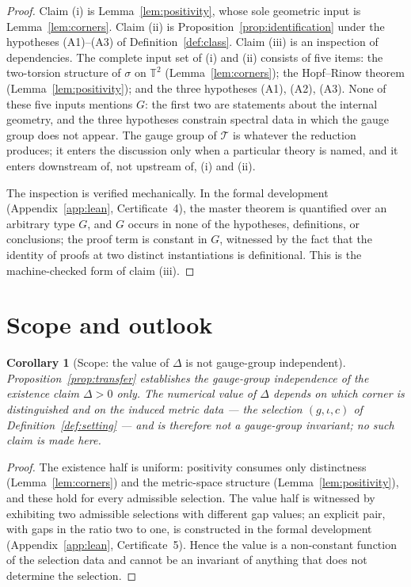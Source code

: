 \documentclass[11pt,a4paper]{article}
\newcommand{\T}{\mathbb{T}}
\newcommand{\thy}{\mathcal{T}}
\theoremstyle{plain}
\newtheorem{corollary}[theorem]{Corollary}
\theoremstyle{definition}
\theoremstyle{remark}
\begin{document}
\begin{proof}
Claim (i) is Lemma~\ref{lem:positivity}, whose sole geometric input is Lemma~\ref{lem:corners}. Claim (ii) is Proposition~\ref{prop:identification} under the hypotheses (A1)--(A3) of Definition~\ref{def:class}. Claim (iii) is an inspection of dependencies. The complete input set of (i) and (ii) consists of five items: the two-torsion structure of $\sigma$ on $\T^2$ (Lemma~\ref{lem:corners}); the Hopf--Rinow theorem (Lemma~\ref{lem:positivity}); and the three hypotheses (A1), (A2), (A3). None of these five inputs mentions $G$: the first two are statements about the internal geometry, and the three hypotheses constrain spectral data in which the gauge group does not appear. The gauge group of $\thy$ is whatever the reduction produces; it enters the discussion only when a particular theory is named, and it enters downstream of, not upstream of, (i) and (ii).

The inspection is verified mechanically. In the formal development (Appendix~\ref{app:lean}, Certificate~4), the master theorem is quantified over an arbitrary type $G$, and $G$ occurs in none of the hypotheses, definitions, or conclusions; the proof term is constant in $G$, witnessed by the fact that the identity of proofs at two distinct instantiations is definitional. This is the machine-checked form of claim (iii).
\end{proof}

\section{Scope and outlook}\label{sec:scope}

\begin{corollary}[Scope: the value of $\Delta$ is not gauge-group
independent]\label{cor:scope} Proposition~\ref{prop:transfer} establishes the gauge-group independence of the existence claim $\Delta > 0$ only. The numerical value of $\Delta$ depends on which corner is distinguished and on the induced metric data --- the selection $(g, \iota, c)$ of Definition~\ref{def:setting} --- and is therefore not a gauge-group invariant; no such claim is made here.
\end{corollary}

\begin{proof}
The existence half is uniform: positivity consumes only distinctness (Lemma~\ref{lem:corners}) and the metric-space structure (Lemma~\ref{lem:positivity}), and these hold for every admissible selection. The value half is witnessed by exhibiting two admissible selections with different gap values; an explicit pair, with gaps in the ratio two to one, is constructed in the formal development (Appendix~\ref{app:lean}, Certificate~5). Hence the value is a non-constant function of the selection data and cannot be an invariant of anything that does not determine the selection.
\end{proof}
\end{document}
